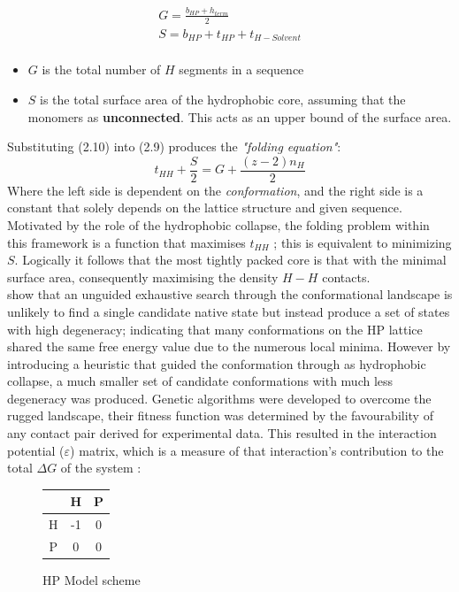 \begin{equation}
    \begin{gathered}
         G = \frac{b_{HP} + h_{term}}{2} \\
         S = b_{HP} + t_{HP} + t_{H-Solvent} \\
    \end{gathered}
\end{equation}
\begin{itemize}
    \item $G$ is the total number of $H$ segments in a sequence
    \item $S$ is the total surface area of the hydrophobic core, assuming that
        the monomers as \textbf{unconnected}. This acts as an upper bound of the surface
        area.
\end{itemize}

Substituting (2.10) into (2.9) produces the \emph{"folding equation"}:
\begin{equation}
    t_{HH} + \frac{S}{2} = G + \frac{(z-2)n_H}{2}
\end{equation}
Where the left side is dependent on the \emph{conformation}, and the right
side is a constant that solely depends on the lattice structure and given sequence.
Motivated by the role of the hydrophobic collapse, the folding problem within this
framework is a function that maximises $t_{HH}$ ; this is equivalent to
minimizing $S$. Logically it follows that the most tightly packed core is that with the minimal
surface area, consequently maximising the density $H-H$ contacts. \\
\cite{Dill,Lau1989} show that an unguided exhaustive search through the conformational
landscape is unlikely to find a single candidate native state but instead produce
a set of states with high degeneracy; indicating that many conformations on the HP lattice shared
the same free energy value due to the numerous local minima. However by introducing
a heuristic that guided the conformation through as hydrophobic collapse, a much
smaller set of candidate conformations with much less degeneracy was produced.
Genetic algorithms were developed to overcome the rugged landscape, their fitness
function was determined by the favourability of any contact 
pair derived for experimental data.
This resulted in the interaction potential ($\varepsilon$) matrix, which is a measure of
that interaction's contribution to the total $\Delta G$ of the system \cite{Hoque}:
\begin{figure}[!htb]
    \centering
        \begin{tabular}{|c || c | c|}
            \hline
             & H & P \\
            \hline
            H & -1 & 0 \\
            \hline
            P & 0 & 0 \\
            \hline
        \end{tabular}
        \caption{HP Model scheme}

\end{figure}
    

